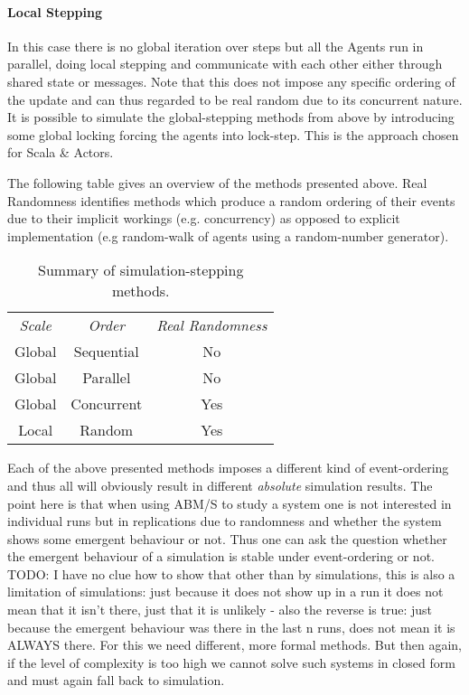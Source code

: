 \paragraph{Local Stepping}
In this case there is no global iteration over steps but all the Agents run in parallel, doing local stepping and communicate with each other either through shared state or messages. Note that this does not impose any specific ordering of the update and can thus regarded to be real random due to its concurrent nature. It is possible to simulate the global-stepping methods from above by introducing some global locking forcing the agents into lock-step. This is the approach chosen for Scala \& Actors.

\bigskip 

The following table gives an overview of the methods presented above. Real Randomness identifies methods which produce a random ordering of their events due to their implicit workings (e.g.  concurrency) as opposed to explicit implementation (e.g random-walk of agents using a random-number generator).

\begin{table}[H]
	\center
	\begin{tabular}{ c | c | c  }
		\textit{Scale} & \textit{Order} & \textit{Real Randomness} \\
		\hhline{=|=|=}
	    Global & Sequential & No \\ 
	    \hline
	    Global & Parallel & No \\ 
	    \hline
	    Global & Concurrent & Yes \\ 
	    \hline
	    Local & Random & Yes \\ 
	\end{tabular}
	\caption{Summary of simulation-stepping methods.}
\end{table}

Each of the above presented methods imposes a different kind of event-ordering and thus all will obviously result in different \textit{absolute} simulation results. The point here is that when using ABM/S to study a system one is not interested in individual runs but in replications due to randomness and whether the system shows some emergent behaviour or not. Thus one can ask the question whether the emergent behaviour of a simulation is stable under event-ordering or not. TODO: I have no clue how to show that other than by simulations, this is also a limitation of simulations: just because it does not show up in a run it does not mean that it isn't there, just that it is unlikely - also the reverse is true: just because the emergent behaviour was there in the last n runs, does not mean it is ALWAYS there. For this we need different, more formal methods. But then again, if the level of complexity is too high we cannot solve such systems in closed form and must again fall back to simulation.


